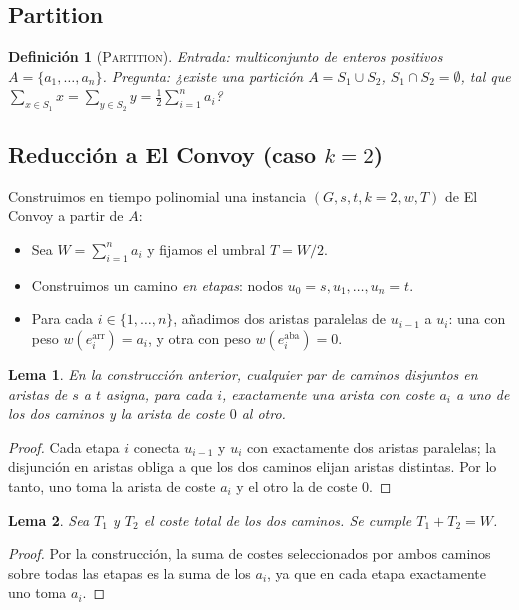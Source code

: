 \documentclass[11pt]{article}
\newtheorem{lemma}{Lema}
\newtheorem{definition}{Definición}
\begin{document}
\subsection{Partition}
\begin{definition}[\textsc{Partition}]
Entrada: multiconjunto de enteros positivos $A=\{a_1,\dots,a_n\}$. Pregunta: ¿existe una partición $A=S_1\cup S_2$, $S_1\cap S_2=\emptyset$, tal que $\sum_{x\in S_1}x=\sum_{y\in S_2}y=\tfrac{1}{2}\sum_{i=1}^n a_i$?
\end{definition}

\subsection{Reducción a El Convoy (caso $k=2$)}
Construimos en tiempo polinomial una instancia $(G,s,t,k=2,w,T)$ de El Convoy a partir de $A$:
\begin{itemize}
  \item Sea $W=\sum_{i=1}^n a_i$ y fijamos el umbral $T=W/2$.
  \item Construimos un camino \emph{en etapas}: nodos $u_0=s, u_1,\dots,u_n=t$.
  \item Para cada $i\in\{1,\dots,n\}$, añadimos dos aristas paralelas de $u_{i-1}$ a $u_i$: una con peso $w(e_i^\text{arr})=a_i$, y otra con peso $w(e_i^\text{aba})=0$.
\end{itemize}

\begin{lemma}
En la construcción anterior, cualquier par de caminos disjuntos en aristas de $s$ a $t$ asigna, para cada $i$, exactamente una arista con coste $a_i$ a uno de los dos caminos y la arista de coste $0$ al otro.
\end{lemma}
\begin{proof}
Cada etapa $i$ conecta $u_{i-1}$ y $u_i$ con exactamente dos aristas paralelas; la disjunción en aristas obliga a que los dos caminos elijan aristas distintas. Por lo tanto, uno toma la arista de coste $a_i$ y el otro la de coste $0$.
\end{proof}

\begin{lemma}
Sea $T_1$ y $T_2$ el coste total de los dos caminos. Se cumple $T_1+T_2=W$.
\end{lemma}
\begin{proof}
Por la construcción, la suma de costes seleccionados por ambos caminos sobre todas las etapas es la suma de los $a_i$, ya que en cada etapa exactamente uno toma $a_i$.
\end{proof}
\end{document}
